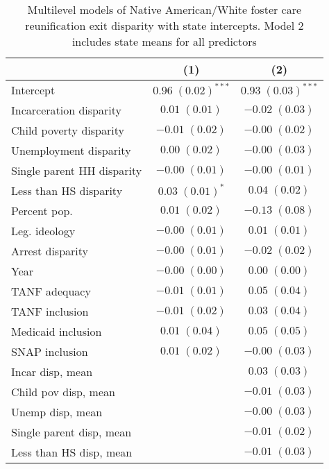 
\begin{table}
\caption{Multilevel models of Native American/White foster care reunification exit disparity with state intercepts. Model 2 includes state means for all predictors }
\begin{center}
\begin{tabular}{l c c }
\hline
 & (1) & (2) \\
\hline
Intercept                  & $0.96 \; (0.02)^{***}$ & $0.93 \; (0.03)^{***}$ \\
Incarceration disparity    & $0.01 \; (0.01)$       & $-0.02 \; (0.03)$      \\
Child poverty disparity    & $-0.01 \; (0.02)$      & $-0.00 \; (0.02)$      \\
Unemployment disparity     & $0.00 \; (0.02)$       & $-0.00 \; (0.03)$      \\
Single parent HH disparity & $-0.00 \; (0.01)$      & $-0.00 \; (0.01)$      \\
Less than HS disparity     & $0.03 \; (0.01)^{*}$   & $0.04 \; (0.02)$       \\
Percent pop.               & $0.01 \; (0.02)$       & $-0.13 \; (0.08)$      \\
Leg. ideology              & $-0.00 \; (0.01)$      & $0.01 \; (0.01)$       \\
Arrest disparity           & $-0.00 \; (0.01)$      & $-0.02 \; (0.02)$      \\
Year                       & $-0.00 \; (0.00)$      & $0.00 \; (0.00)$       \\
TANF adequacy              & $-0.01 \; (0.01)$      & $0.05 \; (0.04)$       \\
TANF inclusion             & $-0.01 \; (0.02)$      & $0.03 \; (0.04)$       \\
Medicaid inclusion         & $0.01 \; (0.04)$       & $0.05 \; (0.05)$       \\
SNAP inclusion             & $0.01 \; (0.02)$       & $-0.00 \; (0.03)$      \\
Incar disp, mean           &                        & $0.03 \; (0.03)$       \\
Child pov disp, mean       &                        & $-0.01 \; (0.03)$      \\
Unemp disp, mean           &                        & $-0.00 \; (0.03)$      \\
Single parent disp, mean   &                        & $-0.01 \; (0.02)$      \\
Less than HS disp, mean    &                        & $-0.01 \; (0.03)$      \\

\end{tabular}
\end{center}
\end{table}
